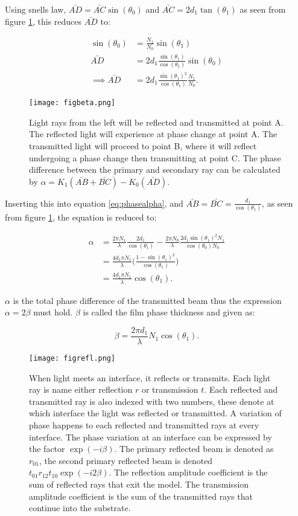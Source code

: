 \documentclass[MasterThesisMain.tex]{subfiles}
\begin{document}
Using snells law, $\bar{AD}=\bar{AC}\sin(\theta_0)$ and $\bar{AC}=2d_1\tan(\theta_1)$ as seen from figure \ref{fig:beta}, this reduces $\bar{AD}$ to:


\begin{align}
\sin(\theta_0) &= \frac{N_1}{N_0}\sin(\theta_1)\\
\bar{AD}&= 2d_1\frac{\sin(\theta_1)}{\cos(\theta_1)}\sin(\theta_0)\\
\implies \bar{AD}&= 2d_1\frac{\sin(\theta_1)^2}{\cos(\theta_1)}\frac{N_1}{N_0}.
\end{align}


\begin{figure}
\centering
\texttt{[image: figbeta.png]}
\caption{Light rays from the left will be reflected and transmitted at point A. The reflected light will experience at phase change at point A. The transmitted light will proceed to point B, where it will reflect undergoing a phase change then transmitting at point C. The phase difference between the primary and secondary ray can be calculated by $\alpha = K_1(\bar{AB}+\bar{BC})-K_0(\bar{AD})$.}
\label{fig:beta}
\end{figure}  

Inserting this into equation \ref{eq:phasealpha}, and $\bar{AB}=\bar{BC}=\frac{d_1}{\cos(\theta_1)}$, as seen from figure \ref{fig:beta}, the equation is reduced to:

\begin{align}
\alpha &= \frac{2\pi N_1}{\lambda}\frac{2d_1}{\cos(\theta_1)}-\frac{2\pi N_0}{\lambda}\frac{2d_1 \sin(\theta_1)^2N_1}{\cos(\theta_0)N_0}\\
&= \frac{4d_1\pi N_1}{\lambda}\bigg(\frac{1-\sin(\theta_1)^2}{\cos(\theta_1)}\bigg)\\
&= \frac{4d_1\pi N_1}{\lambda}\cos(\theta_1).
\end{align}

$\alpha$ is the total phase difference of the transmitted beam thus the expression $\alpha=2\beta$ must hold. $\beta$ is called the film phase thickness and given as: 

\begin{equation}
\beta=\frac{2\pi d_1}{\lambda} N_1\cos(\theta_1).
\end{equation}  

\begin{figure}
\centering
\texttt{[image: figrefl.png]}
\caption{When light meets an interface, it reflects or transmits. Each light ray is name either reflection $r$ or transmission $t$. Each reflected and transmitted ray is also indexed with two numbers, these denote at which interface the light was reflected or transmitted. A variation of phase happens to each reflected and transmitted rays at every interface. The phase variation at an interface can be expressed by the factor $\exp(-i\beta)$. The primary reflected beam is denoted as $r_{01}$, the second primary reflected beam is denoted $t_{01}r_{12}t_{10}\exp(-i2\beta)$. The reflection amplitude coefficient is the sum of reflected rays that exit the model. The transmission amplitude coefficient is the sum of the transmitted rays that continue into the substrate.}
\label{fig:reflect}
\end{figure}
\end{document}
